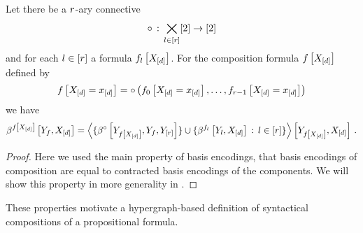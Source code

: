 \begin{lemma}
    \label{lem:basisEncodingConnectiveComposition}
    Let there be a $r$-ary connective
    \begin{align*}
        \circ \,:\, \bigtimes_{l\in[r]}[2] \rightarrow [2]
    \end{align*}
    and for each $l\in[r]$ a formula $f_{l}\left[X_{[d]}\right]$.
    For the composition formula $f\left[X_{[d]}\right]$ defined by
    \begin{align*}
        f\left[X_{[d]}=x_{[d]}\right] =    \circ\left(f_{0}\left[X_{[d]}=x_{[d]}\right],\ldots,f_{r-1}\left[X_{[d]}=x_{[d]}\right]\right)
    \end{align*}
    we have
    \begin{align*}
        \beta^{f\left[X_{[d]}\right]}\left[Y_{f},X_{[d]}\right]
        = \left\langle 
            \{\beta^{\circ}\left[Y_{f\left[X_{[d]}\right]},Y_{f},Y_{[r]}\right]\}
            \cup \{\beta^{f_{l}}\left[Y_{l},X_{[d]}\right] \,:\, l\in[r] \}
        \right\rangle \left[ Y_{f\left[X_{[d]}\right]},X_{[d]} \right] \, .
    \end{align*}
\end{lemma}
\begin{proof}
    Here we used the main property of basis encodings, that basis encodings of composition are equal to contracted basis encodings of the components.
    We will show this property in more generality in .
\end{proof}


These properties motivate a hypergraph-based definition of syntactical compositions of a propositional formula. %

